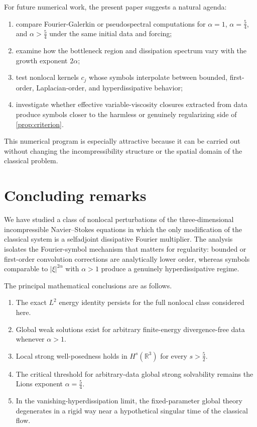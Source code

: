 \documentclass[11pt]{article}
\theoremstyle{definition}
\theoremstyle{remark}
\newcommand{\R}{\mathbb{R}}
\begin{document}
For future numerical work, the present paper suggests a natural agenda:
\begin{enumerate}[label=(\arabic*)]
\item compare Fourier-Galerkin or pseudospectral computations for $\alpha=1$, $\alpha=\frac54$, and $\alpha>\frac54$ under the same initial data and forcing;
\item examine how the bottleneck region and dissipation spectrum vary with the growth exponent $2\alpha$;
\item test nonlocal kernels $c_j$ whose symbols interpolate between bounded, first-order, Laplacian-order, and hyperdissipative behavior;
\item investigate whether effective variable-viscosity closures extracted from data produce symbols closer to the harmless or genuinely regularizing side of \cref{prop:criterion}.
\end{enumerate}
This numerical program is especially attractive because it can be carried out without changing the incompressibility structure or the spatial domain of the classical problem.

\section{Concluding remarks}

We have studied a class of nonlocal perturbations of the three-dimensional incompressible Navier--Stokes equations in which the only modification of the classical system is a selfadjoint dissipative Fourier multiplier. The analysis isolates the Fourier-symbol mechanism that matters for regularity: bounded or first-order convolution corrections are analytically lower order, whereas symbols comparable to $|\xi|^{2\alpha}$ with $\alpha>1$ produce a genuinely hyperdissipative regime.

The principal mathematical conclusions are as follows.
\begin{enumerate}[label=(\roman*)]
\item The exact $L^2$ energy identity persists for the full nonlocal class considered here.
\item Global weak solutions exist for arbitrary finite-energy divergence-free data whenever $\alpha>1$.
\item Local strong well-posedness holds in $H^s(\R^3)$ for every $s>\frac52$.
\item The critical threshold for arbitrary-data global strong solvability remains the Lions exponent $\alpha=\frac54$.
\item In the vanishing-hyperdissipation limit, the fixed-parameter global theory degenerates in a rigid way near a hypothetical singular time of the classical flow.
\end{enumerate}
\end{document}
